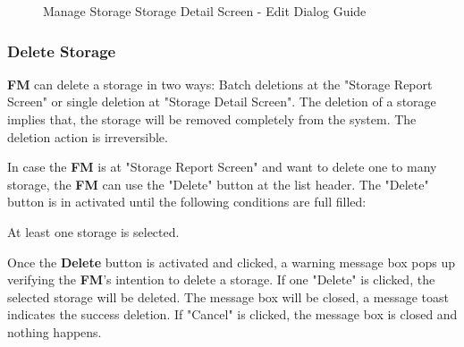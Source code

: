 \begin{figure}[H]
	\centering
    \vspace{5pt}
    \hspace{5pt}
    \caption{Manage Storage Storage Detail Screen - Edit Dialog Guide}
	\label{fig:MSDetailEditBtn}
\end{figure}

\subsubsection{Delete Storage}

\textbf{FM} can delete a storage in two ways: Batch deletions at the "Storage Report Screen" or single deletion at "Storage Detail Screen". 
The deletion of a storage implies that, the storage will be removed completely from the system. The deletion action is irreversible. 

In case the \textbf{FM} is at "Storage Report Screen" and want to delete one to many storage, the \textbf{FM} can use the "Delete" button at the list header. The "Delete" button is in activated until the following conditions are full filled:

\begin{compactenum}
    \item At least one storage is selected.
\end{compactenum}

Once the \textbf{Delete} button is activated and clicked, a warning message box pops up verifying the \textbf{FM}'s intention to delete a storage. If one "Delete" is clicked, the selected storage will be deleted. The message box will be closed, a message toast indicates the success deletion. If "Cancel" is clicked, the message box is closed and nothing happens.

